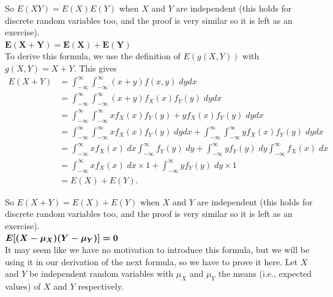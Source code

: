 \noindent So $E(XY) = E(X)E(Y)$ when $X$ and $Y$ are independent (this holds for discrete random variables too, and the proof is very similar so it is left as an exercise). \\

\noindent $\boldsymbol{E(X + Y) = E(X) + E(Y)}$ \\
\noindent To derive this formula, we use the definition of $E(g(X,Y))$ with $g(X,Y) = X + Y$. This gives
\begin{align*}
E(X + Y)    & = \int_{-\infty}^\infty \int_{-\infty}^\infty (x+y)f(x,y) \; dydx \\
		& =  \int_{-\infty}^\infty \int_{-\infty}^\infty (x+y)f_X(x)f_Y(y) \; dydx \tag{since $f(x,y) = f_X(x)f_Y(y)$} \\
		& = \int_{-\infty}^\infty \int_{-\infty}^\infty xf_X(x)f_Y(y) + yf_X(x)f_Y(y) \; dydx \\
		& = \int_{-\infty}^\infty \int_{-\infty}^\infty xf_X(x)f_Y(y) \; dydx + \int_{-\infty}^\infty \int_{-\infty}^\infty yf_X(x)f_Y(y) \; dydx \tag{linearity} \\
		& = \int_{-\infty}^\infty \!\! xf_X(x) \; dx \int_{-\infty}^\infty \!\! f_Y(y) \; dy+\int_{-\infty}^\infty \!\! yf_Y(y) \; dy \int_{-\infty}^\infty \!\! f_X(x) \; dx \tag{decouple}  \\
		& = \int_{-\infty}^\infty xf_X(x) \; dx \times 1 + \int_{-\infty}^\infty yf_Y(y) \; dy \times 1 \tag{since $P(\Omega) = 1$} \\
		& = E(X) + E(Y). \tag{definition of expected value}
\end{align*}

\noindent So $E(X + Y) = E(X) + E(Y)$ when $X$ and $Y$ are independent (this holds for discrete random variables too, and the proof is very similar so it is left as an exercise). \\ 

\noindent $\boldsymbol{E\!\left[(X - \mu_X)(Y - \mu_Y)\right] = 0}$ \\
It may seem like we have no motivation to introduce this formula, but we will be using it in our derivation of the next formula, so we have to prove it here. Let $X$ and $Y$ be independent random variables with $\mu_X$ and $\mu_Y$ the means (i.e., expected values) of $X$ and $Y$ respectively. \\

